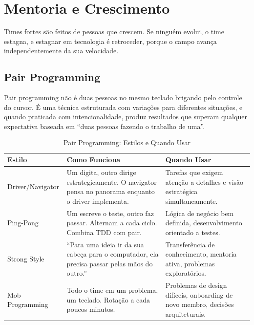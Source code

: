 \section{Mentoria e Crescimento}

Times fortes são feitos de pessoas que crescem. Se ninguém evolui, o time
estagna, e estagnar em tecnologia é retroceder, porque o campo avança
independentemente da sua velocidade.

\subsection{Pair Programming}

Pair programming não é duas pessoas no mesmo teclado brigando pelo controle
do cursor. É uma técnica estruturada com variações para diferentes situações,
e quando praticada com intencionalidade, produz resultados que superam
qualquer expectativa baseada em ``duas pessoas fazendo o trabalho de uma''.

\begin{table}[htbp]
\centering
\caption{Pair Programming: Estilos e Quando Usar}
\begin{tabular}{|p{3cm}|p{4.5cm}|p{5.5cm}|}
\hline
\textbf{Estilo} & \textbf{Como Funciona} & \textbf{Quando Usar} \\
\hline
Driver/Navigator & Um digita, outro dirige estrategicamente. O navigator pensa no panorama enquanto o driver implementa. & Tarefas que exigem atenção a detalhes e visão estratégica simultaneamente. \\
\hline
Ping-Pong & Um escreve o teste, outro faz passar. Alternam a cada ciclo. Combina TDD com pair. & Lógica de negócio bem definida, desenvolvimento orientado a testes. \\
\hline
Strong Style & ``Para uma ideia ir da sua cabeça para o computador, ela precisa passar pelas mãos do outro.'' & Transferência de conhecimento, mentoria ativa, problemas exploratórios. \\
\hline
Mob Programming & Todo o time em um problema, um teclado. Rotação a cada poucos minutos. & Problemas de design difíceis, onboarding de novo membro, decisões arquiteturais. \\
\hline
\end{tabular}
\end{table}

